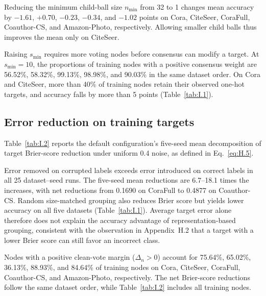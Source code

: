 \documentclass[times,10pt]{elsarticle}
\begin{document}
Reducing the minimum child-ball size \(n_{\min}\) from 32 to 1 changes mean accuracy by \(-1.61\), \(+0.70\), \(-0.23\), \(-0.34\), and \(-1.02\) points on Cora, CiteSeer, CoraFull, Coauthor-CS, and Amazon-Photo, respectively. Allowing smaller child balls thus improves the mean only on CiteSeer.

Raising \(s_{\min}\) requires more voting nodes before consensus can modify a target. At \(s_{\min}=10\), the proportions of training nodes with a positive consensus weight are 56.52\%, 58.32\%, 99.13\%, 98.98\%, and 90.03\% in the same dataset order. On Cora and CiteSeer, more than 40\% of training nodes retain their observed one-hot targets, and accuracy falls by more than 5 points (Table~\ref{tab:I.1}).

\subsection{Error reduction on training targets}\label{sec:I.2}

Table~\ref{tab:I.2} reports the default configuration's five-seed mean decomposition of target Brier-score reduction under uniform 0.4 noise, as defined in Eq.~\eqref{eq:H.5}.



Error removed on corrupted labels exceeds error introduced on correct labels in all 25 dataset--seed runs. The five-seed mean reductions are 6.7--18.1 times the increases, with net reductions from 0.1690 on CoraFull to 0.4877 on Coauthor-CS. Random size-matched grouping also reduces Brier score but yields lower accuracy on all five datasets (Table~\ref{tab:I.1}). Average target error alone therefore does not explain the accuracy advantage of representation-based grouping, consistent with the observation in Appendix~H.2 that a target with a lower Brier score can still favor an incorrect class.

Nodes with a positive clean-vote margin (\(\Delta_n>0\)) account for 75.64\%, 65.02\%, 36.13\%, 88.93\%, and 84.64\% of training nodes on Cora, CiteSeer, CoraFull, Coauthor-CS, and Amazon-Photo, respectively. The net Brier-score reductions follow the same dataset order, while Table~\ref{tab:I.2} includes all training nodes.
\end{document}
